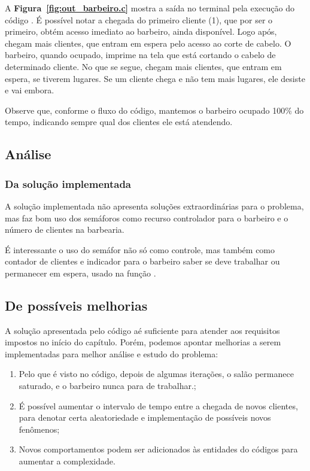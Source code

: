 \documentclass[
	12pt,				%
	openright,			%
	oneside,			%
	a4paper,			%
	chapter=TITLE,		%
	english,			%
	french,				%
	spanish,			%
	brazil				%
	]{abntex2}
\theoremstyle{definition}
\begin{document}
A \textbf{Figura~\ref{fig:out_barbeiro.c}} mostra a saída no terminal pela execução do código . É possível notar a chegada do primeiro cliente (1), que por ser o primeiro, obtém acesso imediato ao barbeiro, ainda disponível. Logo após, chegam mais clientes, que entram em espera pelo acesso ao corte de cabelo. O barbeiro, quando ocupado, imprime na tela que está cortando o cabelo de determinado cliente. No que se segue, chegam mais clientes, que entram em espera, se tiverem lugares. Se um cliente chega e não tem mais lugares, ele desiste e vai embora. 

Observe que, conforme o fluxo do código, mantemos o barbeiro ocupado 100\% do tempo, indicando sempre qual dos clientes ele está atendendo.

\subsection{Análise}
\subsubsection{Da solução implementada}

A solução implementada não apresenta soluções extraordinárias para o problema, mas faz bom uso dos semáforos como recurso controlador para o barbeiro e o número de clientes na barbearia. 

É interessante o uso do semáfor  não só como controle, mas também como contador de clientes e indicador para o barbeiro saber se deve trabalhar ou permanecer em espera, usado na função .

\subsection{De possíveis melhorias}

A solução apresentada pelo código  aé suficiente para atender aos requisitos impostos no início do capítulo. Porém, podemos apontar melhorias a serem implementadas para melhor análise e estudo do problema:
\begin{enumerate}
    \item Pelo que é visto no código, depois de algumas iterações, o salão permanece saturado, e o barbeiro nunca para de trabalhar.;
    \item É possível aumentar o intervalo de tempo entre a chegada de novos clientes, para denotar certa aleatoriedade e implementação de possíveis novos fenômenos;
    \item Novos comportamentos podem ser adicionados às entidades do códigos para aumentar a complexidade.
\end{enumerate}
\end{document}
